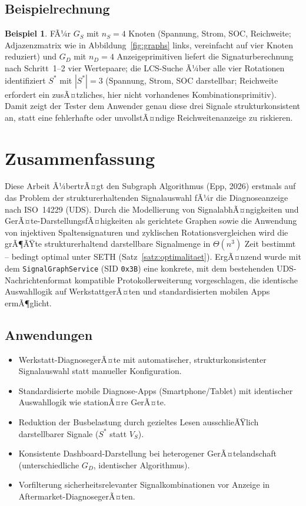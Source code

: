 ﻿\documentclass[a4paper,12pt]{article}
\theoremstyle{definition}
\newtheorem{beispiel}{Beispiel}
\begin{document}
\subsection{Beispielrechnung}

\begin{beispiel}
	FÃ¼r $G_S$ mit $n_S = 4$ Knoten (Spannung, Strom, SOC, Reichweite; Adjazenzmatrix wie in Abbildung~\ref{fig:graphs} links, vereinfacht auf vier Knoten reduziert) und $G_D$ mit $n_D = 4$ Anzeigeprimitiven liefert die Signaturberechnung nach Schritt~1--2 vier Wertepaare; die LCS-Suche Ã¼ber alle vier Rotationen identifiziert $S^\ast$ mit $|S^\ast| = 3$ (Spannung, Strom, SOC darstellbar; Reichweite erfordert ein zusÃ¤tzliches, hier nicht vorhandenes Kombinationsprimitiv). Damit zeigt der Tester dem Anwender genau diese drei Signale strukturkonsistent an, statt eine fehlerhafte oder unvollstÃ¤ndige Reichweitenanzeige zu riskieren.
\end{beispiel}

\section{Zusammenfassung}

Diese Arbeit Ã¼bertrÃ¤gt den Subgraph Algorithmus (Epp, 2026) erstmals auf das Problem der strukturerhaltenden Signalauswahl fÃ¼r die Diagnoseanzeige nach ISO~14229 (UDS). Durch die Modellierung von SignalabhÃ¤ngigkeiten und GerÃ¤te-DarstellungsfÃ¤higkeiten als gerichtete Graphen sowie die Anwendung von injektiven Spaltensignaturen und zyklischen Rotationsvergleichen wird die grÃ¶ÃŸte strukturerhaltend darstellbare Signalmenge in $\Theta(n^3)$ Zeit bestimmt -- bedingt optimal unter SETH (Satz~\ref{satz:optimalitaet}). ErgÃ¤nzend wurde mit dem \texttt{SignalGraphService} (SID \texttt{0x3B}) eine konkrete, mit dem bestehenden UDS-Nachrichtenformat kompatible Protokollerweiterung vorgeschlagen, die identische Auswahllogik auf WerkstattgerÃ¤ten und standardisierten mobilen Apps ermÃ¶glicht.

\subsection{Anwendungen}

\begin{itemize}
	\item Werkstatt-DiagnosegerÃ¤te mit automatischer, strukturkonsistenter Signalauswahl statt manueller Konfiguration.
	\item Standardisierte mobile Diagnose-Apps (Smartphone/Tablet) mit identischer Auswahllogik wie stationÃ¤re GerÃ¤te.
	\item Reduktion der Busbelastung durch gezieltes Lesen ausschlieÃŸlich darstellbarer Signale ($S^\ast$ statt $V_S$).
	\item Konsistente Dashboard-Darstellung bei heterogener GerÃ¤telandschaft (unterschiedliche $G_D$, identischer Algorithmus).
	\item Vorfilterung sicherheitsrelevanter Signalkombinationen vor Anzeige in Aftermarket-DiagnosegerÃ¤ten.
\end{itemize}
\end{document}
